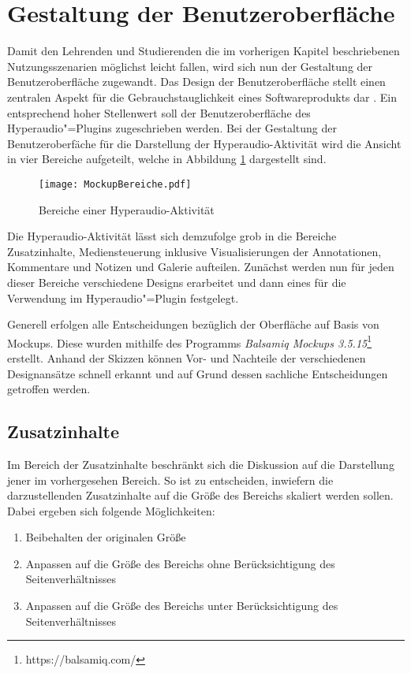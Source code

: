 \section{Gestaltung der Benutzeroberfläche}
Damit den Lehrenden und Studierenden die im vorherigen Kapitel beschriebenen Nutzungsszenarien möglichst leicht fallen, wird sich nun der Gestaltung der Benutzeroberfläche zugewandt. \glqq Das Design der Benutzeroberfläche stellt einen zentralen Aspekt für die Gebrauchstauglichkeit eines Softwareprodukts dar\grqq{} \citep[S. 1]{oppermann2002user}. Ein entsprechend hoher Stellenwert soll der Benutzeroberfläche des Hyperaudio"=Plugins zugeschrieben werden. Bei der Gestaltung der Benutzeroberfäche für die Darstellung der Hyperaudio-Aktivität wird die Ansicht in vier Bereiche aufgeteilt, welche in Abbildung \ref{fig:MockupBereiche} dargestellt sind.

\begin{figure}[h!]
\texttt{[image: MockupBereiche.pdf]}
\caption{\label{fig:MockupBereiche} Bereiche einer Hyperaudio-Aktivität}
\end{figure}

Die Hyperaudio-Aktivität lässt sich demzufolge grob in die Bereiche \glqq Zusatzinhalte\grqq{}, \glqq Mediensteuerung inklusive Visualisierungen der Annotationen\grqq{}, \glqq Kommentare und Notizen\grqq{} und \glqq Galerie\grqq{} aufteilen. Zunächst werden nun für jeden dieser Bereiche verschiedene Designs erarbeitet und dann eines für die Verwendung im Hyperaudio"=Plugin festgelegt.

Generell erfolgen alle Entscheidungen bezüglich der Oberfläche auf Basis von Mockups. Diese wurden mithilfe des Programms \textit{Balsamiq Mockups 3.5.15}\footnote{https://balsamiq.com/} erstellt. Anhand der Skizzen können Vor- und Nachteile der verschiedenen Designansätze schnell erkannt und auf Grund dessen sachliche Entscheidungen getroffen werden. 

\subsection{Zusatzinhalte}
\label{sub:zusatzinhalte}
Im Bereich der Zusatzinhalte beschränkt sich die Diskussion auf die Darstellung jener im vorhergesehen Bereich. So ist zu entscheiden, inwiefern die darzustellenden Zusatzinhalte auf die Größe des Bereichs skaliert werden sollen. Dabei ergeben sich folgende Möglichkeiten:

\begin{enumerate}
\item Beibehalten der originalen Größe
\item Anpassen auf die Größe des Bereichs ohne Berücksichtigung des Seitenverhältnisses
\item Anpassen auf die Größe des Bereichs unter Berücksichtigung des Seitenverhältnisses
\end{enumerate}

